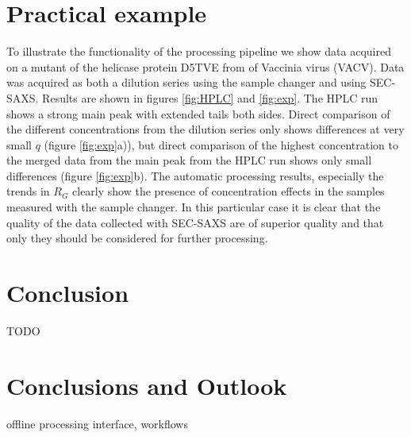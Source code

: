 \documentclass[preprint,pdf]{iucr}              %
\begin{document}
\section{Practical example}
To illustrate the functionality of the processing pipeline we show data acquired
on a mutant of the helicase protein D5TVE from  of Vaccinia virus (VACV). 
Data was acquired as both a dilution series using the sample changer and using
SEC-SAXS.  
Results are shown in figures \ref{fig:HPLC} and \ref{fig:exp}. 
The HPLC run shows a strong main peak with extended tails both sides. 
Direct comparison of the different concentrations from the dilution series only
shows differences at very small $q$ (figure \ref{fig:exp}a)), but direct comparison 
of the highest concentration to the merged data from the main peak from the HPLC run 
shows only small differences (figure \ref{fig:exp}b).
The automatic processing results, especially the trends in $R_{G}$  clearly show the 
presence of concentration effects in the samples measured with the sample changer. 
In this particular case it is clear that the quality of the data collected with SEC-SAXS 
are of superior quality and that only they should be considered for further
processing.

\section{Conclusion}

TODO

\section{Conclusions and Outlook}
offline processing interface, workflows


\begin{references}




\end{references}
\end{document}
